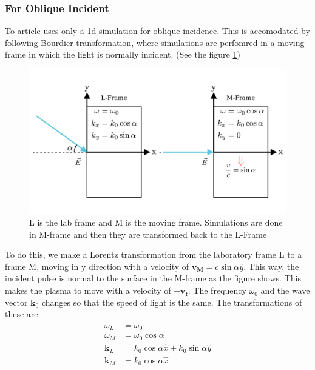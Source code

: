 \documentclass[12pt]{article}
\begin{document}
\subsubsection{For Oblique Incident}

To article uses only a 1d simulation for oblique incidence. This is accomodated by following Bourdier \cite{2d-transformation} transformation, where simulations are perfomred in a moving frame in which the light is normally incident. (See the figure \ref{fig:frames})

\begin{figure}[h]
    \centering
    \includegraphics[width=1\textwidth]{images/frames.png}
    \caption{L is the lab frame and M is the moving frame. Simulations are done in M-frame and then they are transformed back to the L-Frame}
    \label{fig:frames}
\end{figure}

To do this, we make a Lorentz transformation from the laboratory frame L to a frame M, moving in y direction with a velocity of $\mathbf{v_M} = c\sin\alpha \hat{y}$. This way, the incident pulse is normal to the surface in the M-frame as the figure shows. This makes the plasma to move with a velocity of $-\mathbf{v_f}$. The frequency $\omega_0$ and the wave vector $\mathbf{k}_0$ changes so that the speed of light is the same. The transformations of these are:
\begin{align}
    \label{fig:omega-k}
    \begin{split}
        \omega_L     & = \omega_0                                      \\
        \omega_M     & = \omega_0\cos\alpha                            \\
        \mathbf{k}_L & = k_0\cos\alpha \hat{x} + k_0\sin\alpha \hat{y} \\
        \mathbf{k}_M & = k_0\cos\alpha \hat{x}
    \end{split}
\end{align}
\end{document}
